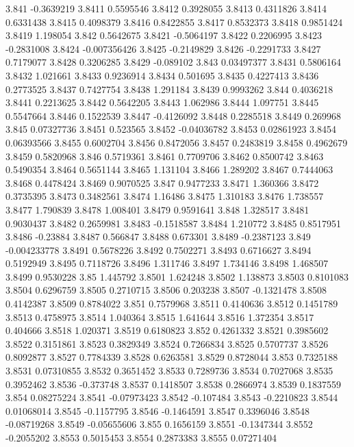 3.841  -0.3639219
3.8411  0.5595546
3.8412  0.3928055
3.8413  0.4311826
3.8414  0.6331438
3.8415  0.4098379
3.8416  0.8422855
3.8417  0.8532373
3.8418  0.9851424
3.8419  1.198054
3.842  0.5642675
3.8421  -0.5064197
3.8422  0.2206995
3.8423  -0.2831008
3.8424  -0.007356426
3.8425  -0.2149829
3.8426  -0.2291733
3.8427  0.7179077
3.8428  0.3206285
3.8429  -0.089102
3.843  0.03497377
3.8431  0.5806164
3.8432  1.021661
3.8433  0.9236914
3.8434  0.501695
3.8435  0.4227413
3.8436  0.2773525
3.8437  0.7427754
3.8438  1.291184
3.8439  0.9993262
3.844  0.4036218
3.8441  0.2213625
3.8442  0.5642205
3.8443  1.062986
3.8444  1.097751
3.8445  0.5547664
3.8446  0.1522539
3.8447  -0.4126092
3.8448  0.2285518
3.8449  0.269968
3.845  0.07327736
3.8451  0.523565
3.8452  -0.04036782
3.8453  0.02861923
3.8454  0.06393566
3.8455  0.6002704
3.8456  0.8472056
3.8457  0.2483819
3.8458  0.4962679
3.8459  0.5820968
3.846  0.5719361
3.8461  0.7709706
3.8462  0.8500742
3.8463  0.5490354
3.8464  0.5651144
3.8465  1.131104
3.8466  1.289202
3.8467  0.7444063
3.8468  0.4478424
3.8469  0.9070525
3.847  0.9477233
3.8471  1.360366
3.8472  0.3735395
3.8473  0.3482561
3.8474  1.16486
3.8475  1.310183
3.8476  1.738557
3.8477  1.790839
3.8478  1.008401
3.8479  0.9591641
3.848  1.328517
3.8481  0.9030437
3.8482  0.2659981
3.8483  -0.1518587
3.8484  1.210772
3.8485  0.8517951
3.8486  -0.23884
3.8487  0.566847
3.8488  0.673301
3.8489  -0.2387123
3.849  -0.004233778
3.8491  0.5678226
3.8492  0.7502271
3.8493  0.6716627
3.8494  0.5192949
3.8495  0.7118726
3.8496  1.311746
3.8497  1.734146
3.8498  1.468507
3.8499  0.9530228
3.85  1.445792
3.8501  1.624248
3.8502  1.138873
3.8503  0.8101083
3.8504  0.6296759
3.8505  0.2710715
3.8506  0.203238
3.8507  -0.1321478
3.8508  0.4142387
3.8509  0.8784022
3.851  0.7579968
3.8511  0.4140636
3.8512  0.1451789
3.8513  0.4758975
3.8514  1.040364
3.8515  1.641644
3.8516  1.372354
3.8517  0.404666
3.8518  1.020371
3.8519  0.6180823
3.852  0.4261332
3.8521  0.3985602
3.8522  0.3151861
3.8523  0.3829349
3.8524  0.7266834
3.8525  0.5707737
3.8526  0.8092877
3.8527  0.7784339
3.8528  0.6263581
3.8529  0.8728044
3.853  0.7325188
3.8531  0.07310855
3.8532  0.3651452
3.8533  0.7289736
3.8534  0.7027068
3.8535  0.3952462
3.8536  -0.373748
3.8537  0.1418507
3.8538  0.2866974
3.8539  0.1837559
3.854  0.08275224
3.8541  -0.07973423
3.8542  -0.107484
3.8543  -0.2210823
3.8544  0.01068014
3.8545  -0.1157795
3.8546  -0.1464591
3.8547  0.3396046
3.8548  -0.08719268
3.8549  -0.05655606
3.855  0.1656159
3.8551  -0.1347344
3.8552  -0.2055202
3.8553  0.5015453
3.8554  0.2873383
3.8555  0.07271404
